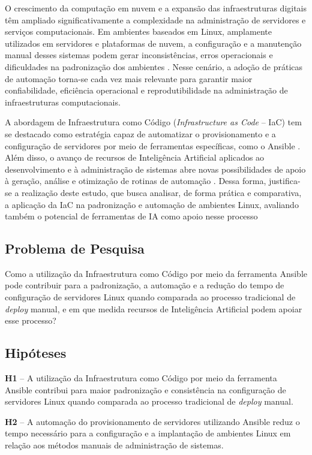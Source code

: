 \documentclass[12pt]{article}
\begin{document}
O crescimento da computação em nuvem e a expansão das infraestruturas digitais têm ampliado significativamente a complexidade na administração de servidores e serviços computacionais. Em ambientes baseados em Linux, amplamente utilizados em servidores e plataformas de nuvem, a configuração e a manutenção manual desses sistemas podem gerar inconsistências, erros operacionais e dificuldades na padronização dos ambientes \cite{redhat2022}. Nesse cenário, a adoção de práticas de automação torna-se cada vez mais relevante para garantir maior confiabilidade, eficiência operacional e reprodutibilidade na administração de infraestruturas computacionais.

A abordagem de Infraestrutura como Código (\textit{Infrastructure as Code} -- IaC) tem se destacado como estratégia capaz de automatizar o provisionamento e a configuração de servidores por meio de ferramentas específicas, como o Ansible \cite{alcidesmaya}. Além disso, o avanço de recursos de Inteligência Artificial aplicados ao desenvolvimento e à administração de sistemas abre novas possibilidades de apoio à geração, análise e otimização de rotinas de automação \cite{pucpr2025}. Dessa forma, justifica-se a realização deste estudo, que busca analisar, de forma prática e comparativa, a aplicação da IaC na padronização e automação de ambientes Linux, avaliando também o potencial de ferramentas de IA como apoio nesse processo

\subsection{Problema de Pesquisa}

Como a utilização da Infraestrutura como Código por meio da ferramenta Ansible pode contribuir para a padronização, a automação e a redução do tempo de configuração de servidores Linux quando comparada ao processo tradicional de \textit{deploy} manual, e em que medida recursos de Inteligência Artificial podem apoiar esse processo?

\subsection{Hipóteses}

\textbf{H1} -- A utilização da Infraestrutura como Código por meio da ferramenta Ansible contribui para maior padronização e consistência na configuração de servidores Linux quando comparada ao processo tradicional de \textit{deploy} manual.

\textbf{H2} -- A automação do provisionamento de servidores utilizando Ansible reduz o tempo necessário para a configuração e a implantação de ambientes Linux em relação aos métodos manuais de administração de sistemas.
\end{document}
